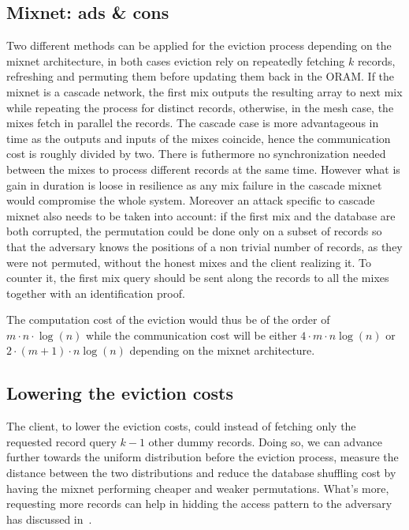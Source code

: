 \documentclass[english,oneside,twocolumn]{article}
\begin{document}
\subsection{Mixnet: ads \& cons}
Two different methods can be applied for the eviction process depending on the mixnet architecture, in both cases eviction rely on repeatedly fetching $k$ records, refreshing and permuting them before updating them back in the ORAM.
If the mixnet is a cascade network, the first mix outputs the resulting array to next mix while repeating the process for distinct records, otherwise, in the mesh case, the mixes fetch in parallel the records.
The cascade case is more advantageous in time as the outputs and inputs of the mixes coincide, hence the communication cost is roughly divided by two. There is futhermore no synchronization needed between the mixes to process different records at the same time.
However what is gain in duration is loose in resilience as any mix failure in the cascade mixnet would compromise the whole system. Moreover an attack specific to cascade mixnet also needs to be taken into account: if the first mix and the database are both corrupted, the permutation could be done only on a subset of records
so that the adversary knows the positions of a non trivial number of records, as they were not permuted, without the honest mixes and the client realizing it. To counter it, the first mix query should be sent along the records to all the mixes together with an identification proof.


The computation cost of the eviction would thus be of the order of $m\cdot n \cdot \log(n)$ while the communication cost will be either $4\cdot m \cdot n \log(n)$ or $2\cdot(m+1) \cdot n \log(n)$ depending on the mixnet architecture.


\subsection{Lowering the eviction costs}

The client, to lower the eviction costs, could instead of fetching only the requested record query $k-1$ other dummy records. Doing so, we can advance further towards the uniform distribution before the eviction process, measure the distance between the two distributions and reduce the database shuffling cost by having the mixnet performing cheaper and weaker permutations.
What's more, requesting more records can help in hidding the access pattern to the adversary has discussed in~\cite{toledo2016lower}.
\end{document}

